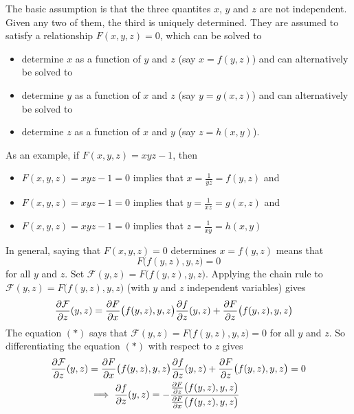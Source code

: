 \begin{solution}
 The basic assumption is that the three quantites $x$, $y$
and $z$ are not independent. Given any two of them, the third is uniquely
determined. They are assumed to satisfy a relationship
$F(x,y,z)=0$, which can be solved to
\begin{itemize}\itemsep1pt \parskip0pt  %
\item
determine $x$ as a function of $y$ and $z$ (say $x=f(y,z)$) and 
can alternatively be solved to
\item
determine $y$ as a function of $x$ and $z$ (say $y=g(x,z)$) and 
can alternatively be solved to
\item
determine $z$ as a function of $x$ and $y$
(say $z=h(x,y)$). 
\end{itemize}
As an example, if $F(x,y,z) = xyz-1$, then 
\begin{itemize}\itemsep1pt \parskip0pt  %
\item
$F(x,y,z)=xyz-1=0$ implies that $x=\frac{1}{yz}=f(y,z)$ and
\item
$F(x,y,z)=xyz-1=0$ implies that $y=\frac{1}{xz}=g(x,z)$ and
\item
$F(x,y,z)=xyz-1=0$ implies that $z=\frac{1}{xy}=h(x,y)$
\end{itemize}
In general, saying that  $F(x,y,z)=0$ determines $x=f(y,z)$ means that 
\begin{equation*}
F\big(f(y,z),y,z\big)=0
\tag{$*$}
\end{equation*}
for all $y$ and $z$. 
Set $\mathcal{F}(y,z)=F\big(f(y,z),y,z\big)$. Applying the chain rule to
$\mathcal{F}(y,z)=F\big(f(y,z),y,z\big)$ (with $y$ and $z$ independent variables) 
gives
\begin{align*}
\pdiff{\mathcal{F}}{z}(y,z) 
&= 
\pdiff{F}{x}\big(f(y,z),y,z\big)
\pdiff{f}{z}(y,z)
+\pdiff{F}{z}\big(f(y,z),y,z\big)
\end{align*}
The equation $(*)$ says that $\mathcal{F}(y,z)=F\big(f(y,z),y,z\big)=0$ 
for all $y$ and $z$.
So differentiating the equation $(*)$ with respect to 
$z$ gives
\begin{align*}
\pdiff{\mathcal{F}}{z}(y,z)&=\pdiff{F}{x}\big(f(y,z),y,z\big)
\pdiff{f}{z}(y,z)
+\pdiff{F}{z}\big(f(y,z),y,z\big)=0 \\
&\implies
\pdiff{f}{z}(y,z)
=-\frac{\pdiff{F}{z}\big(f(y,z),y,z\big)}
{\pdiff{F}{x}\big(f(y,z),y,z\big)}

\end{align*}
\end{solution}

